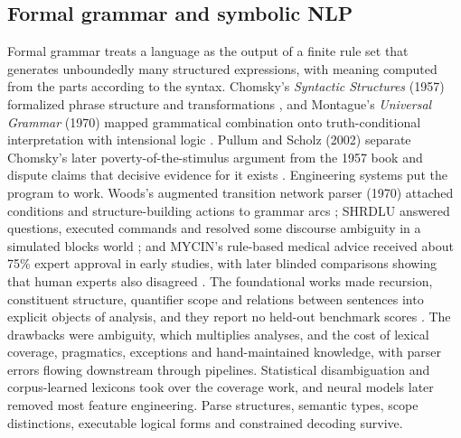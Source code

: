 \subsection{Formal grammar and symbolic NLP}
Formal grammar treats a language as the output of a finite rule set that generates unboundedly many structured expressions, with meaning computed from the parts according to the syntax. Chomsky's \emph{Syntactic Structures} (1957) formalized phrase structure and transformations \cite{pre1}, and Montague's \emph{Universal Grammar} (1970) mapped grammatical combination onto truth-conditional interpretation with intensional logic \cite{pre2}. Pullum and Scholz (2002) separate Chomsky's later poverty-of-the-stimulus argument from the 1957 book and dispute claims that decisive evidence for it exists \cite{pre3}. Engineering systems put the program to work. Woods's augmented transition network parser (1970) attached conditions and structure-building actions to grammar arcs \cite{pre61}; SHRDLU answered questions, executed commands and resolved some discourse ambiguity in a simulated blocks world \cite{pre44}; and MYCIN's rule-based medical advice received about 75\% expert approval in early studies, with later blinded comparisons showing that human experts also disagreed \cite{pre60}. The foundational works made recursion, constituent structure, quantifier scope and relations between sentences into explicit objects of analysis, and they report no held-out benchmark scores \cite{pre1,pre2}. The drawbacks were ambiguity, which multiplies analyses, and the cost of lexical coverage, pragmatics, exceptions and hand-maintained knowledge, with parser errors flowing downstream through pipelines. Statistical disambiguation and corpus-learned lexicons took over the coverage work, and neural models later removed most feature engineering. Parse structures, semantic types, scope distinctions, executable logical forms and constrained decoding survive.

